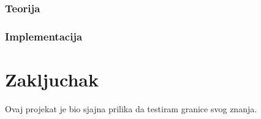 \documentclass[a4paper,fleqn,12pt]{JMThesis}
\begin{document}
\subsection{Teorija}
\smallskip
\subsection{Implementacija}
\smallskip


\chapter{Zakljuchak}
Ovaj projekat je bio sjajna prilika da testiram granice svog znanja.

\thispagestyle{empty}
\mbox{}
\clearpage

\printbibliography[heading=bibintoc,title={Literatura}]
\end{document}
